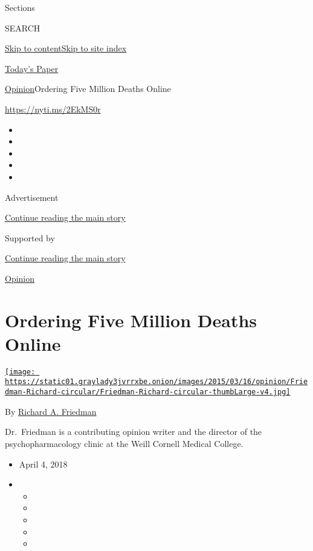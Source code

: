 Sections

SEARCH

\protect\hyperlink{site-content}{Skip to
content}\protect\hyperlink{site-index}{Skip to site index}

\href{https://myaccount.nytimes3xbfgragh.onion/auth/login?response_type=cookie\&client_id=vi}{}

\href{https://www.nytimes3xbfgragh.onion/section/todayspaper}{Today's
Paper}

\href{/section/opinion}{Opinion}\textbar{}Ordering Five Million Deaths
Online

\url{https://nyti.ms/2EkMS0r}

\begin{itemize}
\item
\item
\item
\item
\item
\end{itemize}

Advertisement

\protect\hyperlink{after-top}{Continue reading the main story}

Supported by

\protect\hyperlink{after-sponsor}{Continue reading the main story}

\href{/section/opinion}{Opinion}

\hypertarget{ordering-five-million-deaths-online}{%
\section{Ordering Five Million Deaths
Online}\label{ordering-five-million-deaths-online}}

\href{http://www.nytimes3xbfgragh.onion/column/richard-a-friedman}{\texttt{[image: https://static01.graylady3jvrrxbe.onion/images/2015/03/16/opinion/Friedman-Richard-circular/Friedman-Richard-circular-thumbLarge-v4.jpg]}}

By
\href{http://www.nytimes3xbfgragh.onion/column/richard-a-friedman}{Richard
A. Friedman}

Dr.~Friedman is a contributing opinion writer and the director of the
psychopharmacology clinic at the Weill Cornell Medical College.

\begin{itemize}
\item
  April 4, 2018
\item
  \begin{itemize}
  \item
  \item
  \item
  \item
  \item
  \end{itemize}
\end{itemize}

